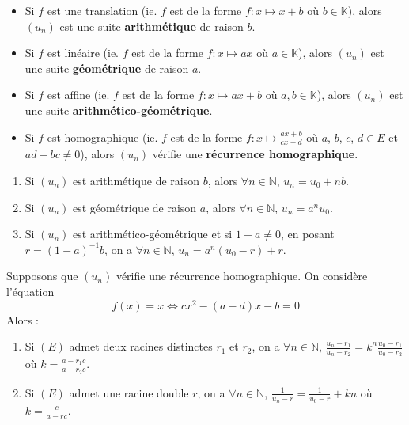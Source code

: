   \begin{definition}
    \begin{itemize}
      \item Si $f$ est une translation (ie. $f$ est de la forme $f : x \mapsto x + b$ où $b \in \mathbb{K}$), alors $(u_n)$ est une suite \textbf{arithmétique} de raison $b$.
      \item Si $f$ est linéaire (ie. $f$ est de la forme $f : x \mapsto ax$ où $a \in \mathbb{K}$), alors $(u_n)$ est une suite \textbf{géométrique} de raison $a$.
      \item Si $f$ est affine (ie. $f$ est de la forme $f : x \mapsto ax + b$ où $a, b \in \mathbb{K}$), alors $(u_n)$ est une suite \textbf{arithmético-géométrique}.
      \item Si $f$ est homographique (ie. $f$ est de la forme $f : x \mapsto \frac{ax + b}{cx + d}$ où $a$, $b$, $c$, $d \in E$ et $ad - bc \neq 0$), alors $(u_n)$ vérifie une \textbf{récurrence homographique}.
    \end{itemize}
  \end{definition}

  \begin{proposition}
    \begin{enumerate}[label={\bfseries(\roman*)}]
      \item Si $(u_n)$ est arithmétique de raison $b$, alors $\forall n \in \mathbb{N}$, $u_n = u_0 + n b$.
      \item Si $(u_n)$ est géométrique de raison $a$, alors $\forall n \in \mathbb{N}$, $u_n = a^n u_0$.
      \item Si $(u_n)$ est arithmético-géométrique et si $1 - a \neq 0$, en posant $r = (1 - a)^{-1} b$, on a $\forall n \in \mathbb{N}$, $u_n = a^n (u_0 - r) + r$.
    \end{enumerate}
  \end{proposition}

  \begin{proposition}
    Supposons que $(u_n)$ vérifie une récurrence homographique. On considère l'équation
    \[ f(x) = x \iff cx^2 - (a-d)x - b = 0 \tag{$E$} \]
    Alors :
    \begin{enumerate}
      \item Si $(E)$ admet deux racines distinctes $r_1$ et $r_2$, on a
      $\forall n \in \mathbb{N}$, $\frac{u_n - r_1}{u_n - r_2} = k^n \frac{u_0 - r_1}{u_0 - r_2}$ où $k = \frac{a - r_1 c}{a - r_2 c}$.
      \item Si $(E)$ admet une racine double $r$, on a $\forall n \in \mathbb{N}$, $\frac{1}{u_n - r} = \frac{1}{u_0 - r} + kn$ où $k = \frac{c}{a - r c}$.
    \end{enumerate}
  \end{proposition}

